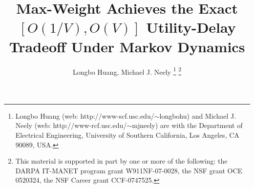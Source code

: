 \documentclass[journal]{IEEEtran}
\begin{document}
\title{Max-Weight Achieves the Exact $[O(1/V), O(V)]$ Utility-Delay Tradeoff Under Markov Dynamics}
\author{\large{Longbo Huang, Michael J. Neely}%
\thanks{Longbo Huang (web:  http://www-scf.usc.edu/$\sim$longbohu)
and Michael J. Neely (web:  http://www-rcf.usc.edu/$\sim$mjneely)
are with the Department of Electrical
Engineering, University of Southern California, Los Angeles, CA 90089, USA.}%
\thanks{This material is supported in part  by one or more of 
the following: the DARPA IT-MANET program
grant W911NF-07-0028, the NSF grant OCE 0520324, 
the NSF Career grant CCF-0747525.} }
\maketitle

\newtheorem{rem}{Remark}
\newtheorem{fact_def}{\textbf{Fact}}
\newtheorem{coro}{\textbf{Corollary}}
\newtheorem{lemma}{\textbf{Lemma}}
\newtheorem{main}{\textbf{Proposition}}
\newtheorem{thm}{\textbf{Theorem}}
\newtheorem{claim}{\emph{Claim}}
\newtheorem{prop}{Proposition}
\newtheorem{assumption}{\textbf{Assumption}}
\end{document}
